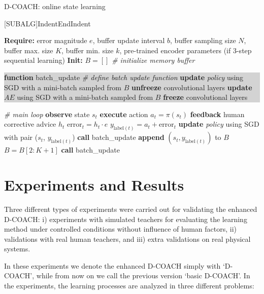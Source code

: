 \begin{algorithm}[h]
\caption{D-COACH: online state learning}\label{algorithm:EnDeepCOACH}
\begin{algorithmic}[1]
[SUBALG]{Indent}{EndIndent}{}{\algorithmicend\ }%

\State \textbf{Require:} error magnitude $\textit{e}$, buffer update interval $b$, buffer sampling size $N$, buffer max. size $K$, buffer min. size $k$, pre-trained encoder parameters (if 3-step sequential learning) 
\State \textbf{Init:} $B = []$ \emph{\# initialize memory buffer}

\colorbox{lightgray}
{\parbox{\linewidth}{\State \textbf{function} batch\_update \emph{\# define batch update function}
\Indent
{}
\State \textbf{update} \emph{policy} using SGD with a mini-batch sampled from $B$
\State \textbf{unfreeze} convolutional layers
\State \textbf{update} $AE$ using SGD with a mini-batch sampled from $B$
\Else
\State \textbf{freeze} convolutional layers
\EndIndent
\EndIf
\EndIf
}}
\colorbox{lightlightgray}{\parbox{\linewidth}{%
 \emph{\# main loop}
\State \textbf{observe} state $s_{t}$
\State \textbf{execute} action $a_{t}=\pi(s_{t})$
\State \textbf{feedback} human corrective advice $h_{t}$
\State $\mathrm{error}_{t} = h_{t}\cdot e$
\State $y_{\mathrm{label}(t)} = a_{t} + \mathrm{error}_{t}$ 
\State \textbf{update} \emph{policy} using SGD with pair ($s_{t}$, $y_{\mathrm{label}(t)}$) 
\State \textbf{call} batch\_update
\EndIf
\State \textbf{append} $(s_{t}, y_{\mathrm{label}(t)})$ to $B$
\State $B = B[2:K+1]$
\EndIf
{}
\State \textbf{call} batch\_update
\EndIf
\EndFor}}
\end{algorithmic}
\end{algorithm}

\section{Experiments and Results}

Three different types of experiments were carried out for validating the enhanced D-COACH: i) experiments with simulated teachers for evaluating the learning method under controlled conditions without influence of human factors, ii) validations with real human teachers, and iii) extra validations on real physical systems.

In these experiments we denote the enhanced D-COACH simply with `D-COACH', while from now on we call the previous version `basic D-COACH'. In the experiments, the learning processes are analyzed in three different problems:

